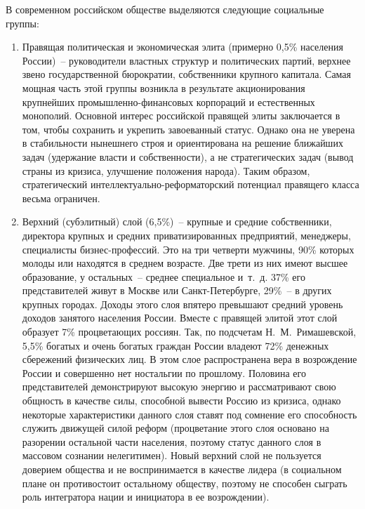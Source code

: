   В современном российском обществе выделяются следующие социальные группы:
  \begin{enumerate}
    \item Правящая политическая и экономическая элита (примерно 0,5\% населения
      России)~-- руководители властных структур и политических партий, верхнее
      звено государственной бюрократии, собственники крупного капитала. Самая
      мощная часть этой группы возникла в результате акционирования крупнейших
      промышленно-финансовых корпораций и естественных монополий. Основной
      интерес российской правящей элиты заключается в том, чтобы сохранить и
      укрепить завоеванный статус. Однако она не уверена в стабильности
      нынешнего строя и ориентирована на решение ближайших задач (удержание
      власти и собственности), а не стратегических задач (вывод страны из
      кризиса, улучшение положения народа). Таким образом, стратегический
      интеллектуально-реформаторский потенциал правящего класса весьма
      ограничен.
    \item Верхний (субэлитный) слой (6,5\%)~-- крупные и средние собственники,
      директора крупных и средних приватизированных предприятий, менеджеры,
      специалисты бизнес-профессий. Это на три четверти мужчины, 90\% которых
      молоды или находятся в среднем возрасте. Две трети из них имеют высшее
      образование, у остальных~-- среднее специальное и~т.~д. 37\% его
      представителей живут в Москве или Санкт-Петербурге, 29\%~-- в других
      крупных городах. Доходы этого слоя впятеро превышают средний уровень
      доходов занятого населения России. Вместе с правящей элитой этот слой
      образует 7\% процветающих россиян. Так, по подсчетам Н.~М.~Римашевской,
      5,5\% богатых и очень богатых граждан России владеют 72\% денежных
      сбережений физических лиц. В этом слое распространена вера в возрождение
      России и совершенно нет ностальгии по прошлому. Половина его
      представителей демонстрируют высокую энергию и рассматривают свою
      общность в качестве силы, способной вывести Россию из кризиса, однако
      некоторые характеристики данного слоя ставят под сомнение его способность
      служить движущей силой реформ (процветание этого слоя основано на
      разорении остальной части населения, поэтому статус данного слоя в
      массовом сознании нелегитимен). Новый верхний слой не пользуется доверием
      общества и не воспринимается в качестве лидера (в социальном плане он
      противостоит остальному обществу, поэтому не способен сыграть роль
      интегратора нации и инициатора в ее возрождении).

\end{enumerate}
